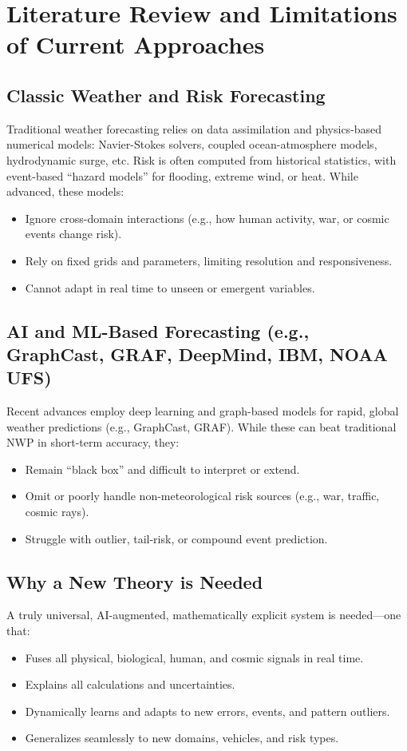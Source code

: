 \documentclass[12pt]{article}
\begin{document}
\section{Literature Review and Limitations of Current Approaches}

\subsection{Classic Weather and Risk Forecasting}
Traditional weather forecasting relies on data assimilation and physics-based numerical models: Navier-Stokes solvers, coupled ocean-atmosphere models, hydrodynamic surge, etc. Risk is often computed from historical statistics, with event-based “hazard models” for flooding, extreme wind, or heat. While advanced, these models:
\begin{itemize}
    \item Ignore cross-domain interactions (e.g., how human activity, war, or cosmic events change risk).
    \item Rely on fixed grids and parameters, limiting resolution and responsiveness.
    \item Cannot adapt in real time to unseen or emergent variables.
\end{itemize}

\subsection{AI and ML-Based Forecasting (e.g., GraphCast, GRAF, DeepMind, IBM, NOAA UFS)}
Recent advances employ deep learning and graph-based models for rapid, global weather predictions (e.g., GraphCast, GRAF). While these can beat traditional NWP in short-term accuracy, they:
\begin{itemize}
    \item Remain “black box” and difficult to interpret or extend.
    \item Omit or poorly handle non-meteorological risk sources (e.g., war, traffic, cosmic rays).
    \item Struggle with outlier, tail-risk, or compound event prediction.
\end{itemize}

\subsection{Why a New Theory is Needed}
A truly universal, AI-augmented, mathematically explicit system is needed—one that:
\begin{itemize}
    \item Fuses all physical, biological, human, and cosmic signals in real time.
    \item Explains all calculations and uncertainties.
    \item Dynamically learns and adapts to new errors, events, and pattern outliers.
    \item Generalizes seamlessly to new domains, vehicles, and risk types.
\end{itemize}
\end{document}
